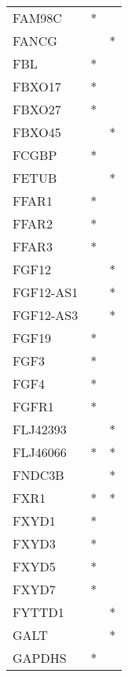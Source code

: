 \begin{longtable}{lcc}
FAM98C           &              * &            \\
FANCG            &                &          * \\
FBL              &              * &            \\
FBXO17           &              * &            \\
FBXO27           &              * &            \\
FBXO45           &                &          * \\
FCGBP            &              * &            \\
FETUB            &                &          * \\
FFAR1            &              * &            \\
FFAR2            &              * &            \\
FFAR3            &              * &            \\
FGF12            &                &          * \\
FGF12-AS1        &                &          * \\
FGF12-AS3        &                &          * \\
FGF19            &              * &            \\
FGF3             &              * &            \\
FGF4             &              * &            \\
FGFR1            &              * &            \\
FLJ42393         &                &          * \\
FLJ46066         &              * &          * \\
FNDC3B           &                &          * \\
FXR1             &              * &          * \\
FXYD1            &              * &            \\
FXYD3            &              * &            \\
FXYD5            &              * &            \\
FXYD7            &              * &            \\
FYTTD1           &                &          * \\
GALT             &                &          * \\
GAPDHS           &              * &            \\

\end{longtable}
